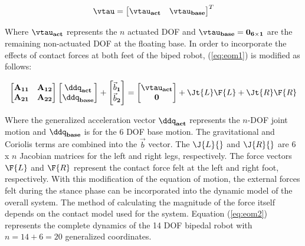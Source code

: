 \begin{equation}
	\label{eq:gentau}
	\vtau = {\begin{bmatrix} {\vtau}_{\mathbf{act}} & {\vtau}_{\mathbf{base}} \\ \end{bmatrix}}^T
\end{equation}

Where ${\vtau}_{\mathbf{act}}$ represents the $n$ actuated DOF and ${\vtau}_{\mathbf{base}} = \bf{0}_{6 \times 1} $ are the remaining non-actuated DOF at the floating base. In order to incorporate the effects of contact forces at both feet of the biped robot, (\ref{eq:eom1}) is modified as follows: 

\begin{equation}
	\label{eq:eom2}
	\begin{bmatrix} \mathbf{A_{11}} & \mathbf{A_{12}} \\ \mathbf{A_{21}} & \mathbf{A_{22}} \end{bmatrix} 
	\begin{bmatrix} \ddq_{\mathbf{act}} \\ \ddq_{\mathbf{base}} \end{bmatrix} + 
	\begin{bmatrix} \vec{b}_{\mathbf 1} \\ \vec{b}_{\mathbf 2} \end{bmatrix} = 
	\begin{bmatrix} {\vtau}_{\mathbf{act}} \\ \mathbf{0} \end{bmatrix} + 
    \Jt{L}\F{L} + \Jt{R}\F{R}
\end{equation}

Where the generalized acceleration vector $\ddq_{\mathbf{act}}$ represents the $n$-DOF joint motion and $\ddq_{\mathbf{base}}$ is for the 6 DOF base motion. The gravitational and Coriolis terms are combined into the $\vec{b}$ vector. The $\J{L}{}$ and $\J{R}{}$ are 6 x $n$ Jacobian matrices for the left and right legs, respectively. The force vectors $\F{L}$ and $\F{R}$ represent the contact force felt at the left and right foot, respectively. With this modification of the equation of motion, the external forces felt during the stance phase can be incorporated into the dynamic model of the overall system. The method of calculating the magnitude of the force itself depends on the contact model used for the system. Equation (\ref{eq:eom2}) represents the complete dynamics of the 14 DOF bipedal robot with $n = 14 + 6 = 20$ generalized coordinates.

